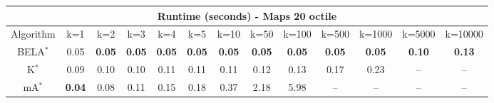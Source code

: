 \begin{tabular}{c|cccccccccccc}\toprule
\multicolumn{13}{c}{Runtime (seconds) - Maps 20 octile}\\ \midrule
Algorithm & k=1 & k=2 & k=3 & k=4 & k=5 & k=10 & k=50 & k=100 & k=500 & k=1000 & k=5000 & k=10000 \\ \midrule
BELA$^*$ & 0.05 & \textbf{0.05} & \textbf{0.05} & \textbf{0.05} & \textbf{0.05} & \textbf{0.05} & \textbf{0.05} & \textbf{0.05} & \textbf{0.05} & \textbf{0.05} & \textbf{0.10} & \textbf{0.13} \\
K$^*$ & 0.09 & 0.10 & 0.10 & 0.11 & 0.11 & 0.11 & 0.12 & 0.13 & 0.17 & 0.23 & -- & -- \\
mA$^*$ & \textbf{0.04} & 0.08 & 0.11 & 0.15 & 0.18 & 0.37 & 2.18 & 5.98 & -- & -- & -- & -- \\ \bottomrule 
\end{tabular}

